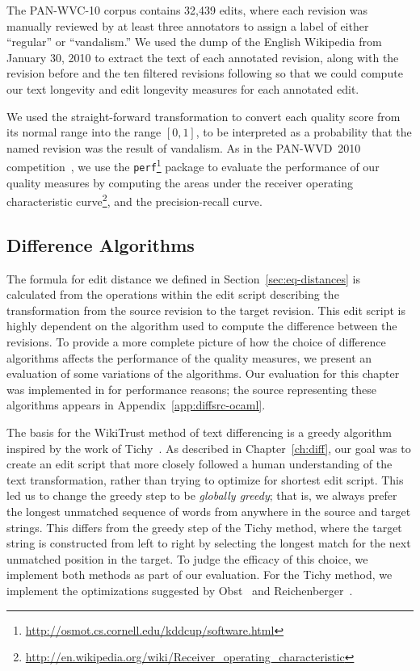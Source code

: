 The PAN-WVC-10 corpus contains 32,439 edits, where each revision was
manually reviewed by at least three annotators to assign a label
of either ``regular'' or ``vandalism.''
We used the dump of the English Wikipedia from January 30, 2010
to extract the text of each annotated revision, along with the revision
before and the ten filtered revisions following so that we could compute
our text longevity and edit longevity measures for each annotated edit.

We used the straight-forward transformation to convert
each quality score from its normal range into the range
$[0,1]$, to be interpreted as a probability that the named
revision was the result of vandalism.
As in the PAN-WVD~2010 competition~\cite{Potthast2010b}, we use the
\texttt{perf}\footnote{\url{http://osmot.cs.cornell.edu/kddcup/software.html}}
package to evaluate the performance of our quality measures
by computing the areas under the receiver operating characteristic
curve\footnote{\url{http://en.wikipedia.org/wiki/Receiver_operating_characteristic}},
and the precision-recall curve.

\subsection{Difference Algorithms}

The formula for edit distance we defined in
Section~\ref{sec:eq-distances} is calculated
from the operations within the edit script describing the transformation
from the source revision to the target revision.
This edit script is highly dependent on the algorithm used to
compute the difference between the revisions.
To provide a more complete picture of how the choice of difference
algorithms affects the performance of the quality measures,
we present an evaluation of some variations of the algorithms.
Our evaluation for this chapter was implemented in \ocaml for performance
reasons; the \ocaml source representing these algorithms appears
in Appendix~\ref{app:diffsrc-ocaml}.

The basis for the WikiTrust method of text differencing is a greedy
algorithm inspired by the work of Tichy~\cite{Tichy1984}.
As described in Chapter~\ref{ch:diff}, our goal was to create an edit
script that more closely followed a human understanding of the text
transformation, rather than trying to optimize for shortest edit script.
This led us to change the greedy step to be \textit{globally greedy};
that is, we always prefer the longest unmatched sequence of words
from anywhere in the source and target strings.
This differs from the greedy step of the Tichy method, where the
target string is constructed from left to right by selecting the longest
match for the next unmatched position in the target.
To judge the efficacy of this choice, we implement both methods as part
of our evaluation.
For the Tichy method, we implement the optimizations suggested by
Obst~\cite{Obst1987} and Reichenberger~\cite{Reichenberger1991}.


